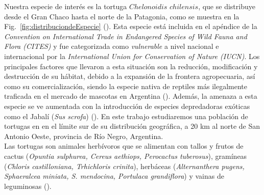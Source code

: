 Nuestra especie de interés es la tortuga $Chelonoidis$ $chilensis$, que se distribuye desde el Gran Chaco hasta el norte de la Patagonia, como se muestra en la Fig.~\ref{fig:distribuciondeEspecie} (\cite{chebez2008se}). Esta especie está incluida en el apéndice de la \textit{Convention on International Trade in Endangered Species of Wild Fauna and Flora (CITES)} y fue categorizada como \textit{vulnerable} a nivel nacional \cite{prado2012categorizacion} e internacional por la \textit{International Union for Conservation of Nature (IUCN)}.
Los principales factores que llevaron a esta situación son la reducción, modificación y destrucción de su hábitat, debido a la expansión de la frontera agropecuaria, así como su comercialización, siendo la especie nativa de reptiles más ilegalmente traficada en el mercado de mascotas en Argentina (\cite{prado2012categorizacion}). Además, la amenaza a esta especie se ve aumentada con la introducción de especies depredadoras exóticas como el Jabalí (\textit{Sus scrofa}) (\cite{kubisch2014chelonoidis}). En este trabajo estudiaremos una población de tortugas en en el límite sur de su distribución geográfica, a 20 km al norte de San Antonio Oeste, provincia de Río Negro, Argentina.  \\
   
Las tortugas son animales  herbívoros que se alimentan con tallos y frutos de cactus (\textit{Opuntia sulphurea, Cereus aethiops, Perocactus tuberosus}), gramíneas (\textit{Chloris castilloniana, Trhichloris crinita}), herbáceas (\textit{Alternanthera pugens, Sphaeralcea miniata, S. mendocina, Portulaca grandiflora}) y vainas de leguminosas (\cite{zacarias2016biologia}).
   
   
   
